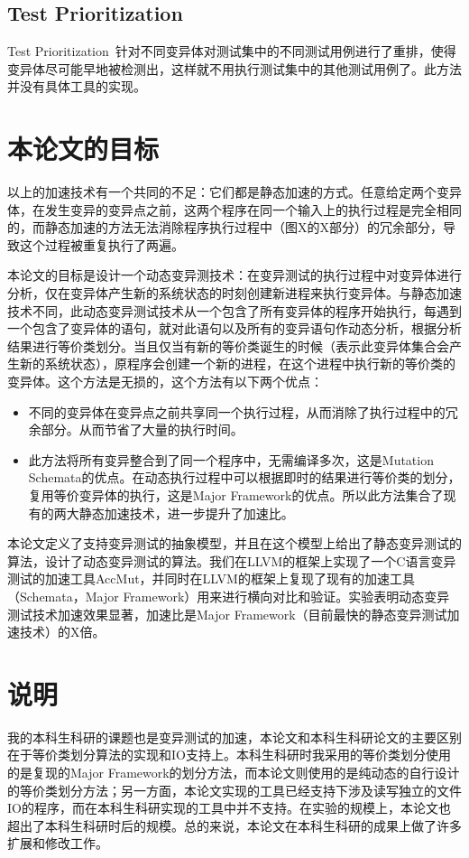 \documentclass[nofonts]{ctexrep}
\begin{document}
\subsection{Test Prioritization}
Test Prioritization~\cite{zhang2013faster}针对不同变异体对测试集中的不同测试用例进行了重排，使得变异体尽可能早地被检测出，这样就不用执行测试集中的其他测试用例了。此方法并没有具体工具的实现。


\section{本论文的目标}
以上的加速技术有一个共同的不足：它们都是静态加速的方式。任意给定两个变异体，在发生变异的变异点之前，这两个程序在同一个输入上的执行过程是完全相同的，而静态加速的方法无法消除程序执行过程中（图X的X部分）的冗余部分，导致这个过程被重复执行了两遍。

本论文的目标是设计一个动态变异测技术：在变异测试的执行过程中对变异体进行分析，仅在变异体产生新的系统状态的时刻创建新进程来执行变异体。与静态加速技术不同，此动态变异测试技术从一个包含了所有变异体的程序开始执行，每遇到一个包含了变异体的语句，就对此语句以及所有的变异语句作动态分析，根据分析结果进行等价类划分。当且仅当有新的等价类诞生的时候（表示此变异体集合会产生新的系统状态），原程序会创建一个新的进程，在这个进程中执行新的等价类的变异体。这个方法是无损的，这个方法有以下两个优点：
\begin{itemize}
\item 不同的变异体在变异点之前共享同一个执行过程，从而消除了执行过程中的冗余部分。从而节省了大量的执行时间。
\item 此方法将所有变异整合到了同一个程序中，无需编译多次，这是Mutation Schemata的优点。在动态执行过程中可以根据即时的结果进行等价类的划分，复用等价变异体的执行，这是Major Framework的优点。所以此方法集合了现有的两大静态加速技术，进一步提升了加速比。
\end{itemize}

本论文定义了支持变异测试的抽象模型，并且在这个模型上给出了静态变异测试的算法，设计了动态变异测试的算法。我们在LLVM的框架上实现了一个C语言变异测试的加速工具AccMut，并同时在LLVM的框架上复现了现有的加速工具（Schemata，Major Framework）用来进行横向对比和验证。实验表明动态变异测试技术加速效果显著，加速比是Major Framework（目前最快的静态变异测试加速技术）的X倍。

\section*{说明}
我的本科生科研的课题也是变异测试的加速，本论文和本科生科研论文的主要区别在于等价类划分算法的实现和IO支持上。本科生科研时我采用的等价类划分使用的是复现的Major Framework的划分方法，而本论文则使用的是纯动态的自行设计的等价类划分方法；另一方面，本论文实现的工具已经支持下涉及读写独立的文件IO的程序，而在本科生科研实现的工具中并不支持。在实验的规模上，本论文也超出了本科生科研时后的规模。总的来说，本论文在本科生科研的成果上做了许多扩展和修改工作。
\end{document}
